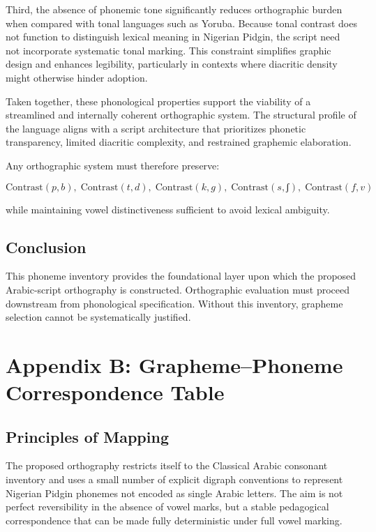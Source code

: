 \documentclass[12pt]{article}
\begin{document}
Third, the absence of phonemic tone significantly reduces orthographic burden when compared with tonal languages such as Yoruba. Because tonal contrast does not function to distinguish lexical meaning in Nigerian Pidgin, the script need not incorporate systematic tonal marking. This constraint simplifies graphic design and enhances legibility, particularly in contexts where diacritic density might otherwise hinder adoption.

Taken together, these phonological properties support the viability of a streamlined and internally coherent orthographic system. The structural profile of the language aligns with a script architecture that prioritizes phonetic transparency, limited diacritic complexity, and restrained graphemic elaboration.

Any orthographic system must therefore preserve:

\[
\text{Contrast}(p,b),\;
\text{Contrast}(t,d),\;
\text{Contrast}(k,g),\;
\text{Contrast}(s,ʃ),\;
\text{Contrast}(f,v)
\]

while maintaining vowel distinctiveness sufficient to avoid lexical ambiguity.

\subsection{Conclusion}

This phoneme inventory provides the foundational layer upon which the proposed Arabic-script orthography is constructed. Orthographic evaluation must proceed downstream from phonological specification. Without this inventory, grapheme selection cannot be systematically justified.

\section{Appendix B: Grapheme--Phoneme Correspondence Table}

\subsection{Principles of Mapping}

The proposed orthography restricts itself to the Classical Arabic consonant inventory and uses a small number of explicit digraph conventions to represent Nigerian Pidgin phonemes not encoded as single Arabic letters. The aim is not perfect reversibility in the absence of vowel marks, but a stable pedagogical correspondence that can be made fully deterministic under full vowel marking.
\end{document}
